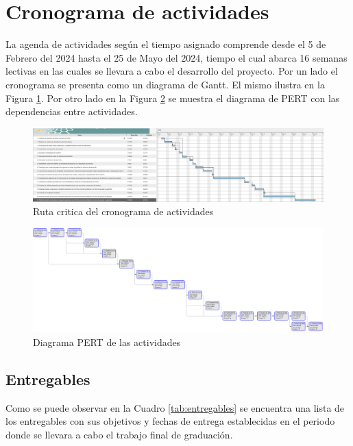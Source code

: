 \documentclass[12pt]{article}
\begin{document}
\section{Cronograma de actividades}

La agenda de actividades según el tiempo asignado comprende desde el  5 de Febrero del 2024 hasta el 25 de Mayo del 2024, tiempo el cual abarca 16 semanas lectivas en las cuales se llevara a cabo el desarrollo del proyecto. Por un lado el cronograma se presenta como un diagrama de Gantt. El mismo ilustra en la Figura \ref{fig:gantt}. Por otro lado en la Figura \ref{fig:pert} se muestra el diagrama de PERT con las dependencias entre actividades.
\newpage

\begin{figure}
  \centering
  \includegraphics[scale=0.3, angle=90]{diagramas/gantt.png}
  \caption{Ruta critica del cronograma de actividades}
  \label{fig:gantt}
\end{figure}

\begin{figure}
  \centering
  \includegraphics[scale=0.3, angle=90]{diagramas/pert.png}
  \caption{Diagrama PERT de las actividades}
  \label{fig:pert}
\end{figure}


\subsection{Entregables}

Como se puede observar en la Cuadro \ref{tab:entregables} se encuentra una lista de los entregables con sus objetivos y fechas de entrega establecidas en el periodo donde se llevara a cabo el trabajo final de graduación.
\end{document}
